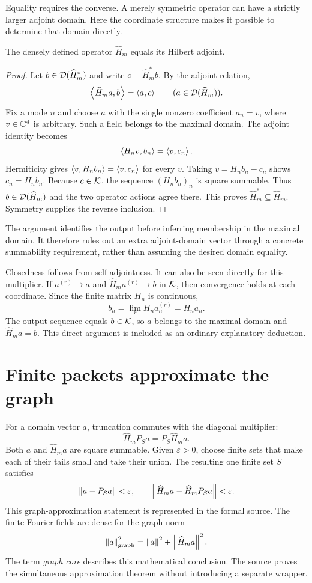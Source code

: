 Equality requires the converse. A merely symmetric operator can have a strictly larger adjoint domain. Here the coordinate structure makes it possible to determine that domain directly.

\begin{theorem}
The densely defined operator $\widehat H_m$ equals its Hilbert adjoint.
\end{theorem}
\begin{proof}
Let $b\in\mathcal D(\widehat H_m^*)$ and write $c=\widehat H_m^*b$. By the adjoint relation,
\[
\left\langle\widehat H_ma,b\right\rangle=\left\langle a,c\right\rangle
\qquad(a\in\mathcal D(\widehat H_m)).
\]
Fix a mode $n$ and choose $a$ with the single nonzero coefficient $a_n=v$, where $v\in\mathbb C^4$ is arbitrary. Such a field belongs to the maximal domain. The adjoint identity becomes
\[
\left\langle H_nv,b_n\right\rangle=\left\langle v,c_n\right\rangle.
\]
Hermiticity gives $\left\langle v,H_nb_n\right\rangle=\left\langle v,c_n\right\rangle$ for every $v$. Taking $v=H_nb_n-c_n$ shows $c_n=H_nb_n$. Because $c\in\mathcal K$, the sequence $(H_nb_n)_n$ is square summable. Thus $b\in\mathcal D(\widehat H_m)$ and the two operator actions agree there. This proves $\widehat H_m^*\subseteq\widehat H_m$. Symmetry supplies the reverse inclusion.
\end{proof}

The argument identifies the output before inferring membership in the maximal domain. It therefore rules out an extra adjoint-domain vector through a concrete summability requirement, rather than assuming the desired domain equality.

Closedness follows from self-adjointness. It can also be seen directly for this multiplier. If $a^{(r)}\to a$ and $\widehat H_ma^{(r)}\to b$ in $\mathcal K$, then convergence holds at each coordinate. Since the finite matrix $H_n$ is continuous,
\[
b_n=\lim_rH_na_n^{(r)}=H_na_n.
\]
The output sequence equals $b\in\mathcal K$, so $a$ belongs to the maximal domain and $\widehat H_ma=b$. This direct argument is included as an ordinary explanatory deduction.

\section{Finite packets approximate the graph}
For a domain vector $a$, truncation commutes with the diagonal multiplier:
\[
\widehat H_mP_Sa=P_S\widehat H_ma.
\]
Both $a$ and $\widehat H_ma$ are square summable. Given $\varepsilon>0$, choose finite sets that make each of their tails small and take their union. The resulting one finite set $S$ satisfies
\[
\left\lVert a-P_Sa\right\rVert<\varepsilon,
\qquad
\left\lVert\widehat H_ma-\widehat H_mP_Sa\right\rVert<\varepsilon.
\]
This graph-approximation statement is represented in the formal source. The finite Fourier fields are dense for the graph norm
\[
\left\lVert a\right\rVert_{\mathrm{graph}}^2
=\left\lVert a\right\rVert^2+\left\lVert\widehat H_ma\right\rVert^2.
\]
The term \emph{graph core} describes this mathematical conclusion. The source proves the simultaneous approximation theorem without introducing a separate  wrapper.

